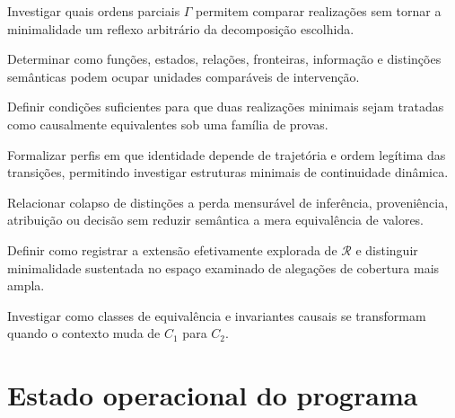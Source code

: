 \documentclass[11pt,a4paper]{article}
\begin{document}
\begin{markerbox}
Investigar quais ordens parciais $\Gamma$ permitem comparar realizações sem tornar a
minimalidade um reflexo arbitrário da decomposição escolhida.
\end{markerbox}

\begin{markerbox}
Determinar como funções, estados, relações, fronteiras, informação e distinções
semânticas podem ocupar unidades comparáveis de intervenção.
\end{markerbox}

\begin{markerbox}
Definir condições suficientes para que duas realizações minimais sejam tratadas como
causalmente equivalentes sob uma família de provas.
\end{markerbox}

\begin{markerbox}
Formalizar perfis em que identidade depende de trajetória e ordem legítima das
transições, permitindo investigar estruturas minimais de continuidade dinâmica.
\end{markerbox}

\begin{markerbox}
Relacionar colapso de distinções a perda mensurável de inferência, proveniência,
atribuição ou decisão sem reduzir semântica a mera equivalência de valores.
\end{markerbox}

\begin{markerbox}
Definir como registrar a extensão efetivamente explorada de $\mathcal R$ e distinguir
minimalidade sustentada no espaço examinado de alegações de cobertura mais ampla.
\end{markerbox}

\begin{markerbox}
Investigar como classes de equivalência e invariantes causais se transformam quando o
contexto muda de $C_1$ para $C_2$.
\end{markerbox}

\section{Estado operacional do programa}
\end{document}
